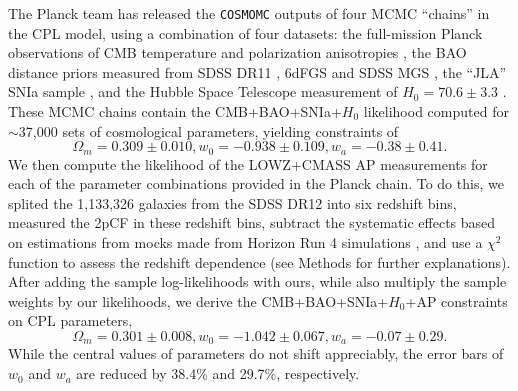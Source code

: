 \documentclass{natureprintstyle}
\let\citep\cite
\begin{document}
The Planck team has released the {\texttt {COSMOMC}} \citep{LB2002} outputs of four MCMC ``chains'' in the CPL model, 
using a combination of four datasets:
the full-mission Planck observations of CMB temperature and polarization anisotropies \cite{Planck2015},
the BAO distance priors measured from SDSS DR11 \citep{Anderson2013}, 6dFGS \citep{6dFGS} and SDSS MGS \citep{MGS},
the ``JLA'' SNIa sample \citep{JLA},
and the Hubble Space Telescope measurement of $H_0=70.6\pm3.3$ \cite{Riess2011,E14H0}.
These MCMC chains contain the CMB+BAO+SNIa+$H_0$ likelihood computed for $\sim$37,000 sets of cosmological parameters,
yielding constraints of 
\begin{equation}
 \Omega_m = 0.309 \pm 0.010, w_0 = -0.938 \pm 0.109, w_a = -0.38 \pm 0.41.
\end{equation}
We then compute the likelihood of the LOWZ+CMASS AP measurements for each of the parameter combinations provided in the Planck chain. 
To do this, we splited the 1,133,326 galaxies from the SDSS DR12 into six redshift bins,
measured the 2pCF in these redshift bins, 
subtract the systematic effects based on estimations from mocks made from Horizon Run 4 simulations \citep{HR4},
and use a $\chi^2$ function to assess the redshift dependence
(see Methods for further explanations).
After adding the sample log-likelihoods with ours, 
while also multiply the sample weights by our likelihoods, 
we derive the CMB+BAO+SNIa+$H_0$+AP constraints on CPL parameters,
\begin{equation}
\Omega_m = 0.301 \pm 0.008, w_0 = -1.042 \pm 0.067, w_a = -0.07 \pm 0.29.
\end{equation}
While the central values of parameters do not shift appreciably,
the error bars of $w_0$ and $w_a$ are reduced by 38.4\% and 29.7\%, respectively.%
\end{document}
